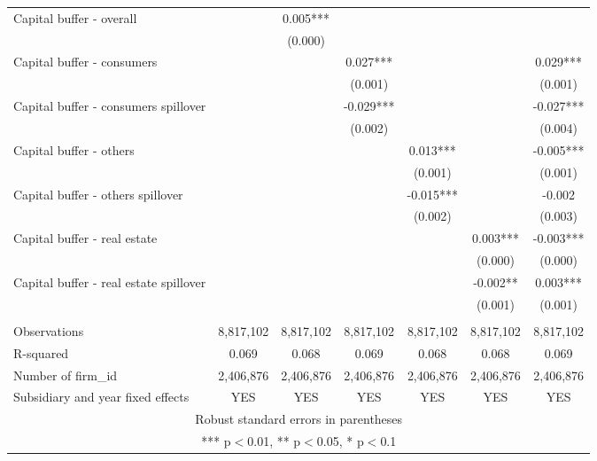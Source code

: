 \begin{tabular}{lcccccc}
Capital buffer - overall &  & 0.005*** &  &  &  &  \\
 &  & (0.000) &  &  &  &  \\
Capital buffer - consumers &  &  & 0.027*** &  &  & 0.029*** \\
 &  &  & (0.001) &  &  & (0.001) \\
Capital buffer - consumers spillover &  &  & -0.029*** &  &  & -0.027*** \\
 &  &  & (0.002) &  &  & (0.004) \\
Capital buffer - others &  &  &  & 0.013*** &  & -0.005*** \\
 &  &  &  & (0.001) &  & (0.001) \\
Capital buffer - others spillover &  &  &  & -0.015*** &  & -0.002 \\
 &  &  &  & (0.002) &  & (0.003) \\
Capital buffer - real estate &  &  &  &  & 0.003*** & -0.003*** \\
 &  &  &  &  & (0.000) & (0.000) \\
Capital buffer - real estate spillover &  &  &  &  & -0.002** & 0.003*** \\
 &  &  &  &  & (0.001) & (0.001) \\
 &  &  &  &  &  &  \\
Observations & 8,817,102 & 8,817,102 & 8,817,102 & 8,817,102 & 8,817,102 & 8,817,102 \\
R-squared & 0.069 & 0.068 & 0.069 & 0.068 & 0.068 & 0.069 \\
Number of firm\_id & 2,406,876 & 2,406,876 & 2,406,876 & 2,406,876 & 2,406,876 & 2,406,876 \\
 Subsidiary and year fixed effects & YES & YES & YES & YES & YES & YES \\ \hline
\multicolumn{7}{c}{ Robust standard errors in parentheses} \\
\multicolumn{7}{c}{ *** p$<$0.01, ** p$<$0.05, * p$<$0.1} \\
\end{tabular}
